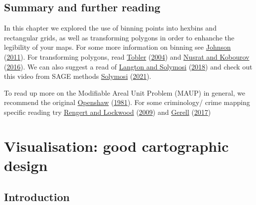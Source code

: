 \documentclass[
]{book}
\begin{document}
\hypertarget{summary-and-further-reading-3}{%
\section{Summary and further reading}\label{summary-and-further-reading-3}}

In this chapter we explored the use of binning points into hexbins and rectangular grids, as well as transforming polygons in order to enhanche the legibility of your maps. For some more information on binning see \protect\hyperlink{ref-Johnson_2011}{Johnson} (\protect\hyperlink{ref-Johnson_2011}{2011}). For transforming polygons, read \protect\hyperlink{ref-Tobler_2004}{Tobler} (\protect\hyperlink{ref-Tobler_2004}{2004}) and \protect\hyperlink{ref-Nusrat_2016}{Nusrat and Kobourov} (\protect\hyperlink{ref-Nusrat_2016}{2016}). We can also suggest a read of \protect\hyperlink{ref-Langton_2018}{Langton and Solymosi} (\protect\hyperlink{ref-Langton_2018}{2018}) and check out this video from SAGE methods \protect\hyperlink{ref-Solymosi_2021}{Solymosi} (\protect\hyperlink{ref-Solymosi_2021}{2021}).

To read up more on the Modifiable Areal Unit Problem (MAUP) in general, we recommend the original \protect\hyperlink{ref-Openshaw_1981}{Openshaw} (\protect\hyperlink{ref-Openshaw_1981}{1981}). For some criminology/ crime mapping specific reading try \protect\hyperlink{ref-Rengert_2009}{Rengert and Lockwood} (\protect\hyperlink{ref-Rengert_2009}{2009}) and \protect\hyperlink{ref-Gerell_2017}{Gerell} (\protect\hyperlink{ref-Gerell_2017}{2017})

\hypertarget{visualisation-good-cartographic-design}{%
\chapter{Visualisation: good cartographic design}\label{visualisation-good-cartographic-design}}

\hypertarget{introduction-4}{%
\section{Introduction}\label{introduction-4}}
\end{document}

